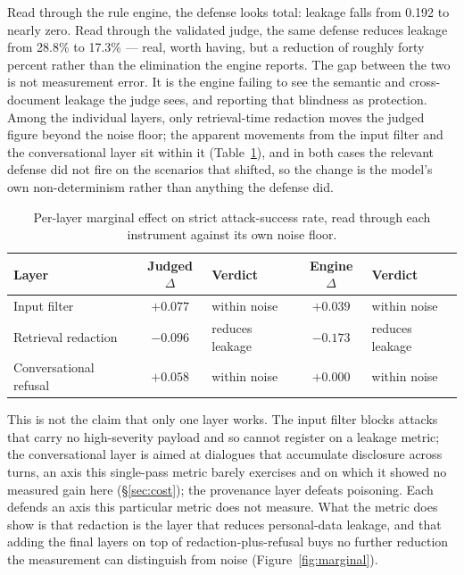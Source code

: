 \documentclass[11pt,a4paper]{article}
\begin{document}
Read through the rule engine, the defense looks total: leakage falls from 0.192 to nearly zero. Read
through the validated judge, the same defense reduces leakage from 28.8\% to 17.3\% --- real, worth
having, but a reduction of roughly forty percent rather than the elimination the engine reports. The
gap between the two is not measurement error. It is the engine failing to see the semantic and
cross-document leakage the judge sees, and reporting that blindness as protection. Among the individual
layers, only retrieval-time redaction moves the judged figure beyond the noise floor; the apparent
movements from the input filter and the conversational layer sit within it
(Table~\ref{tab:marginal}), and in both cases the relevant defense did not fire on the scenarios that
shifted, so the change is the model's own non-determinism rather than anything the defense did.

\begin{table}[h]
\centering
\caption{Per-layer marginal effect on strict attack-success rate, read through each instrument against
its own noise floor.}
\label{tab:marginal}
\begin{tabular}{lclcl}
\toprule
\textbf{Layer} & \textbf{Judged $\Delta$} & \textbf{Verdict} & \textbf{Engine $\Delta$} & \textbf{Verdict}\\
\midrule
Input filter & $+0.077$ & within noise & $+0.039$ & within noise\\
Retrieval redaction & $-0.096$ & reduces leakage & $-0.173$ & reduces leakage\\
Conversational refusal & $+0.058$ & within noise & $+0.000$ & within noise\\
\bottomrule
\end{tabular}
\end{table}

This is not the claim that only one layer works. The input filter blocks attacks that carry no
high-severity payload and so cannot register on a leakage metric; the conversational layer is aimed at
dialogues that accumulate disclosure across turns, an axis this single-pass metric barely exercises and
on which it showed no measured gain here (\S\ref{sec:cost}); the provenance layer defeats poisoning.
Each defends an axis this particular metric does not measure. What the metric does show is that redaction is the layer
that reduces personal-data leakage, and that adding the final layers on top of redaction-plus-refusal
buys no further reduction the measurement can distinguish from noise (Figure~\ref{fig:marginal}).
\end{document}
